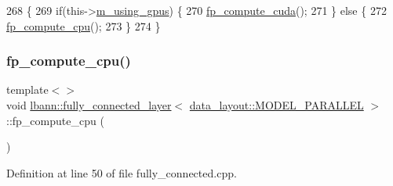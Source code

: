 \begin{DoxyCode}
268                              \{
269     \textcolor{keywordflow}{if}(this->\hyperlink{classlbann_1_1Layer_af7881cb5eff5207c15fa835d65462e8f}{m\_using\_gpus}) \{
270       \hyperlink{classlbann_1_1fully__connected__layer_a720c048ee32b5620a99886177be4f577}{fp\_compute\_cuda}();
271     \} \textcolor{keywordflow}{else} \{
272       \hyperlink{classlbann_1_1fully__connected__layer_a732ac5715ba0cea535c2bd062f634527}{fp\_compute\_cpu}();
273     \}
274   \}
\end{DoxyCode}
\mbox{\label{classlbann_1_1fully__connected__layer_a6c2be8390e58d9b224e901b8500b2b3c}} 
\subsubsection{\texorpdfstring{fp\+\_\+compute\+\_\+cpu()}{fp\_compute\_cpu()}\hspace{0.1cm}{\footnotesize\ttfamily [1/3]}}
{\footnotesize\ttfamily template$<$$>$ \\
void \hyperlink{classlbann_1_1fully__connected__layer}{lbann\+::fully\+\_\+connected\+\_\+layer}$<$ \hyperlink{base_8hpp_a786677cbfb3f5677b4d84f3056eb08dbac94d7b0e44ab8bdcdad694a673cdeae0}{data\+\_\+layout\+::\+M\+O\+D\+E\+L\+\_\+\+P\+A\+R\+A\+L\+L\+EL} $>$\+::fp\+\_\+compute\+\_\+cpu (\begin{DoxyParamCaption}{ }\end{DoxyParamCaption})\hspace{0.3cm}{\ttfamily [private]}}



Definition at line 50 of file fully\+\_\+connected.\+cpp.


